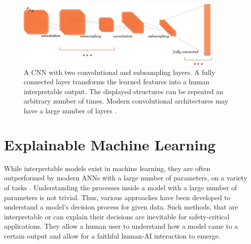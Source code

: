 \documentclass[a4paper,cleardoubleempty,BCOR1cm, 11pt]{report}
\begin{document}
\begin{figure}
	\centering
		\includegraphics[width=0.9\textwidth]{images/convnet.pdf} 
		\caption{A CNN with two convolutional and subsampling layers. A fully connected layer transforms the learned features into a human interpretable output. The displayed structures can be repeated an arbitrary number of times. Modern convolutional architectures may have a large number of layers \cite{he2016deep,szegedy2015going,xie2017aggregated}.}
		\label{fig:convnet}
\end{figure}


\section{Explainable Machine Learning}
While interpretable models exist in machine learning, they are often outperformed by modern ANNs with a large number of parameters, on a variety of tasks \cite{gunning2019xai, guo2020explainable, sarkar2016accuracy, puiutta2020explainable}. Understanding the processes inside a model with a large number of parameters is not trivial. Thus, various approaches have been developed to understand a model's decision process for given data. Such methods, that are interpretable or can explain their decisions are inevitable for safety-critical applications. They allow a human user to understand how a model came to a certain output and allow for a faithful human-AI interaction to emerge.
\end{document}
